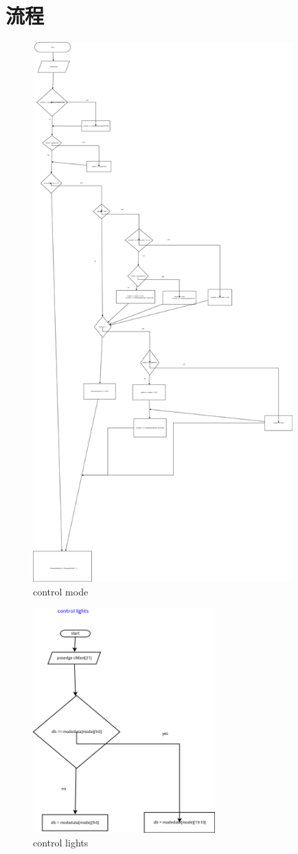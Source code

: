 \documentclass[11pt,a4paper]{article}
\begin{document}
\section{流程}
\begin{figure}[H]
  \centering
  \includegraphics[width=10cm]{control_mode}
  \caption{control mode}
\end{figure}
\begin{figure}[H]
  \centering
  \includegraphics[width=7cm]{lights}
  \caption{control lights}
\end{figure}
\end{document}
